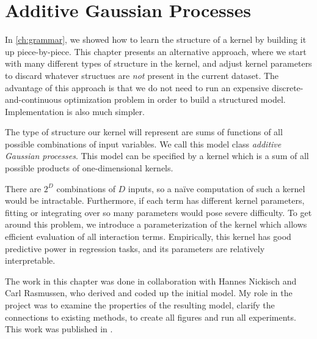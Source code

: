 
\inbpdocument



\chapter{Additive Gaussian Processes}
\label{ch:additive}


In \cref{ch:grammar}, we showed how to learn the structure of a kernel by building it up piece-by-piece.
This chapter presents an alternative approach, where we start with many different types of structure in the kernel, and adjust kernel parameters to discard whatever structues are \emph{not} present in the current dataset.
The advantage of this approach is that we do not need to run an expensive discrete-and-continuous optimization problem in order to build a structured model.
Implementation is also much simpler.

The type of structure our kernel will represent are sums of functions of all possible combinations of input variables.
We call this model class \emph{additive Gaussian processes}.
This model can be specified by a kernel which is a sum of all possible products of one-dimensional kernels.

There are $2^D$ combinations of $D$ inputs, so a na\"{i}ve computation of such a kernel would be intractable.
Furthermore, if each term has different kernel parameters, fitting or integrating over so many parameters would pose severe difficulty.
To get around this problem, we introduce a parameterization of the kernel which allows efficient evaluation of all interaction terms.
Empirically, this kernel has good predictive power in regression tasks, and its parameters are relatively interpretable.

The work in this chapter was done in collaboration with Hannes Nickisch and Carl Rasmussen, who derived and coded up the initial model.
My role in the project was to examine the properties of the resulting model, clarify the connections to existing methods, to create all figures and run all experiments.
This work was published in \citet{duvenaud2011additive11}.





